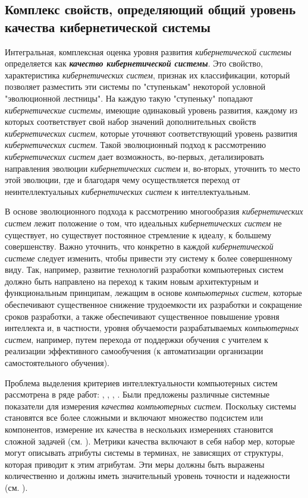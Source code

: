 \subsection{Комплекс свойств, определяющий общий уровень качества кибернетической системы}
{\label{sec_cyb_syst_overall_quality}} 

Интегральная, комплексная оценка уровня развития \textit{кибернетической системы} определяется как \textbf{\textit{качество кибернетической системы}}. Это свойство, характеристика \textit{кибернетических систем}, признак их классификации, который позволяет разместить эти системы по "ступенькам"{} некоторой условной "эволюционной лестницы"{}.
На каждую такую "ступеньку"{} попадают \textit{кибернетические системы}, имеющие одинаковый уровень развития, каждому из которых соответствует свой набор значений дополнительных свойств \textit{кибернетических систем}, которые уточняют соответствующий уровень развития \textit{кибернетических систем}. Такой эволюционный подход к рассмотрению \textit{кибернетических систем} дает возможность, во-первых, детализировать направления эволюции \textit{кибернетических систем} и, во-вторых, уточнить то место этой эволюции, где и благодаря чему осуществляется переход от неинтеллектуальных \textit{кибернетических систем} к интеллектуальным.

В основе эволюционного подхода к рассмотрению многообразия \textit{кибернетических систем} лежит положение о том, что идеальных \textit{кибернетических систем} не существует, но существует постоянное стремление к идеалу, к большему совершенству. 
Важно уточнить, что конкретно в каждой \textit{кибернетической системе} следует изменить, чтобы привести эту систему к более совершенному виду. Так, например, развитие технологий разработки компьютерных систем должно быть направлено на переход к таким новым архитектурным и функциональным принципам, лежащим в основе \textit{компьютерных систем}, которые обеспечивают существенное снижение трудоемкости их разработки и сокращение сроков разработки, а также обеспечивают существенное повышение уровня интеллекта и, в частности, уровня обучаемости разрабатываемых \textit{компьютерных систем}, например, путем перехода от поддержки обучения с учителем к реализации эффективного самообучения (к автоматизации организации самостоятельного обучения). 

Проблема выделения критериев интеллектуальности компьютерных систем рассмотрена в ряде работ: , , , . Были предложены различные системные показатели для измерения \textit{качества компьютерных систем}. Поскольку системы становятся все более сложными и включают множество подсистем или компонентов, измерение их качества в нескольких измерениях становится сложной задачей (см. ). Метрики качества включают в себя набор мер, которые могут описывать атрибуты системы в терминах, не зависящих от структуры, которая приводит к этим атрибутам. Эти меры должны быть выражены количественно и должны иметь значительный уровень точности и надежности (см. ). 

